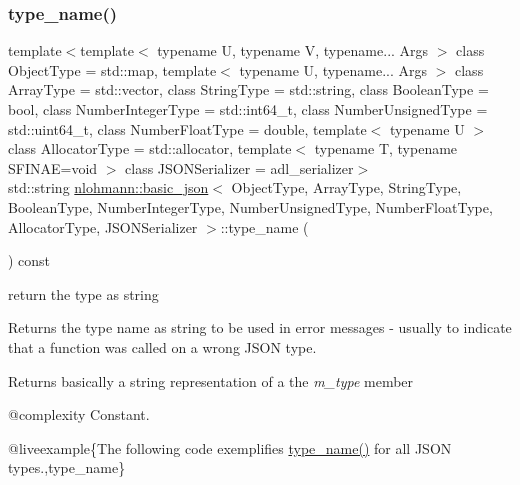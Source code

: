 \subsubsection{\texorpdfstring{type\_name()}{type\_name()}}
{\footnotesize\ttfamily template$<$template$<$ typename U, typename V, typename... Args $>$ class Object\+Type = std\+::map, template$<$ typename U, typename... Args $>$ class Array\+Type = std\+::vector, class String\+Type  = std\+::string, class Boolean\+Type  = bool, class Number\+Integer\+Type  = std\+::int64\+\_\+t, class Number\+Unsigned\+Type  = std\+::uint64\+\_\+t, class Number\+Float\+Type  = double, template$<$ typename U $>$ class Allocator\+Type = std\+::allocator, template$<$ typename T, typename S\+F\+I\+N\+A\+E=void $>$ class J\+S\+O\+N\+Serializer = adl\+\_\+serializer$>$ \\
std\+::string \mbox{\hyperlink{classnlohmann_1_1basic__json}{nlohmann\+::basic\+\_\+json}}$<$ Object\+Type, Array\+Type, String\+Type, Boolean\+Type, Number\+Integer\+Type, Number\+Unsigned\+Type, Number\+Float\+Type, Allocator\+Type, J\+S\+O\+N\+Serializer $>$\+::type\+\_\+name (\begin{DoxyParamCaption}{ }\end{DoxyParamCaption}) const\hspace{0.3cm}{\ttfamily [inline]}}



return the type as string 

Returns the type name as string to be used in error messages -\/ usually to indicate that a function was called on a wrong J\+S\+ON type.

\begin{DoxyReturn}{Returns}
basically a string representation of a the {\itshape m\+\_\+type} member
\end{DoxyReturn}
@complexity Constant.

@liveexample\{The following code exemplifies {\ttfamily \mbox{\hyperlink{classnlohmann_1_1basic__json_a6b75862bdb4d26650616cf9821430755}{type\+\_\+name()}}} for all J\+S\+ON types.,type\+\_\+name\}

